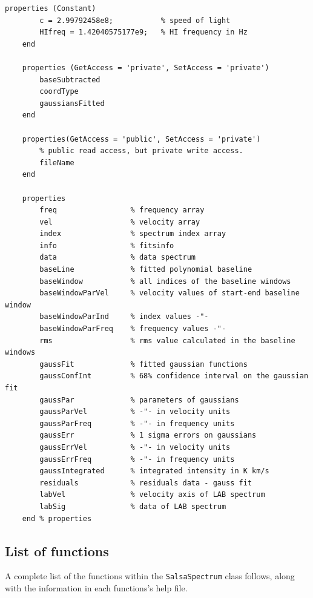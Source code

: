 \documentclass[11pt,a4paper]{article}
\begin{document}
\begin{lstlisting}[framerule=0pt]
    properties (Constant)
        c = 2.99792458e8;           % speed of light
        HIfreq = 1.42040575177e9;   % HI frequency in Hz
    end
    
    properties (GetAccess = 'private', SetAccess = 'private')
        baseSubtracted
        coordType
        gaussiansFitted
    end
    
    properties(GetAccess = 'public', SetAccess = 'private')
        % public read access, but private write access.
        fileName
    end
    
    properties
        freq                 % frequency array
        vel                  % velocity array
        index                % spectrum index array
        info                 % fitsinfo
        data                 % data spectrum
        baseLine             % fitted polynomial baseline
        baseWindow           % all indices of the baseline windows
        baseWindowParVel     % velocity values of start-end baseline window
        baseWindowParInd     % index values -"-
        baseWindowParFreq    % frequency values -"-
        rms                  % rms value calculated in the baseline windows
        gaussFit             % fitted gaussian functions
        gaussConfInt         % 68% confidence interval on the gaussian fit
        gaussPar             % parameters of gaussians
        gaussParVel          % -"- in velocity units
        gaussParFreq         % -"- in frequency units
        gaussErr             % 1 sigma errors on gaussians
        gaussErrVel          % -"- in velocity units
        gaussErrFreq         % -"- in frequency units
        gaussIntegrated      % integrated intensity in K km/s
        residuals            % residuals data - gauss fit
        labVel               % velocity axis of LAB spectrum
        labSig               % data of LAB spectrum        
    end % properties
\end{lstlisting}

\subsection{List of functions}
\label{sec:list-functions}

A complete list of the functions within the \texttt{SalsaSpectrum}
class follows, along with the information in each functions's help file.
\end{document}
